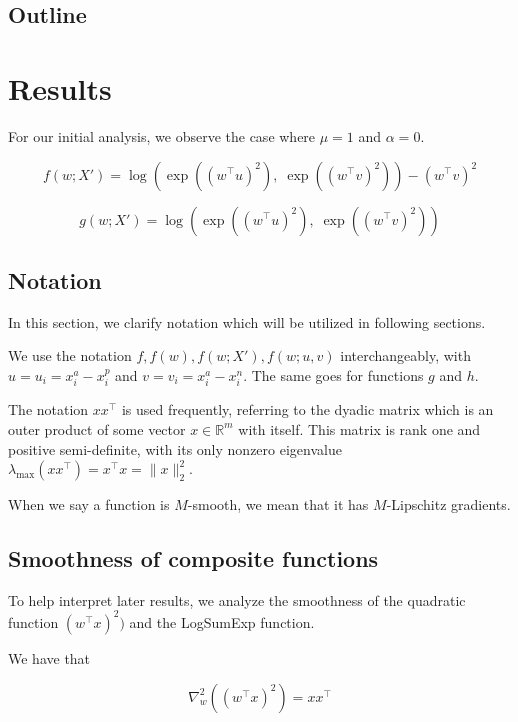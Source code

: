 \documentclass[11pt]{article}
\begin{document}
\subsection{Outline}

\section{Results}

For our initial analysis, we observe the case where $\mu = 1$ and $\alpha = 0$.

\begin{equation}
    f(w; X') = \log(\exp((w^{\top} u)^2), \; \exp((w^{\top} v)^2)) - (w^{\top} v)^2 
\end{equation}

\begin{equation}
    g(w; X') = \log(\exp((w^{\top} u)^2), \; \exp((w^{\top} v)^2))
\end{equation}

\subsection{Notation}

In this section, we clarify notation which will be utilized in following sections.

We use the notation $f, f(w), f(w; X'), f(w; u, v)$ interchangeably, with $u = u_i = x_i^a - x_i^p$ and $v = v_i = x_i^a - x_i^n$. The same goes for functions $g$ and $h$.

The notation $xx^{\top}$ is used frequently, referring to the dyadic matrix which is an outer product of some vector $x \in \mathbb{R}^m$ with itself. This matrix is rank one and positive semi-definite, with its only nonzero eigenvalue $\lambda_{\max}(xx^{\top}) = x^{\top}x = \|x\|_2^2$.

When we say a function is $M$-smooth, we mean that it has $M$-Lipschitz gradients.

\subsection{Smoothness of composite functions}

To help interpret later results, we analyze the smoothness of the quadratic function $(w^{\top} x)^2)$ and the LogSumExp function.

We have that

\begin{equation}
    \nabla_w^2 ((w^{\top} x)^2) = xx^{\top}
\end{equation}
\end{document}
